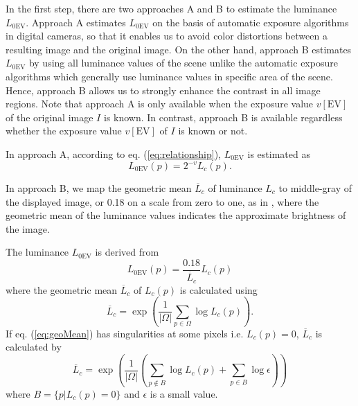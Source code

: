\documentclass[paper]{ieice}
\begin{document}
  In the first step, there are two approaches A and B
  to estimate the luminance $L_{0 \mathrm{EV}}$.
  Approach A estimates $L_{0 \mathrm{EV}}$ on the basis of automatic exposure algorithms
  in digital cameras,
  so that it enables us to avoid color distortions between
  a resulting image and the original image.
  On the other hand, approach B estimates $L_{0 \mathrm{EV}}$
  by using all luminance values of the scene
  unlike the automatic exposure algorithms
  which generally use luminance values in specific area of the scene.
  Hence, approach B allows us to strongly enhance the contrast in all image regions.
  Note that approach A is only available
  when the exposure value $v \mathrm{[EV]}$ of the original image $I$ is known.
  In contrast, approach B is available regardless
  whether the exposure value $v \mathrm{[EV]}$ of $I$ is known or not.
%
  \begin{description}[style=nextline,font=\mdseries,leftmargin=0pt,listparindent=2em,parsep=1pt]
    \item[A. Estimating $L_{0 \mathrm{EV}}$ with exposure value $v$]
      In approach A, according to eq. (\ref{eq:relationship}),
      $L_{0 \mathrm{EV}}$ is estimated as
      \begin{equation}
        L_{0 \mathrm{EV}}(p) = 2^{-v} L_c(p).
        \label{eq:knownEV}
      \end{equation}
    \item[B. Estimating $L_{0\mathrm{EV}}$ without exposure value $v$]
      In approach B, we map the geometric mean $\overline{L}_c$ of luminance $L_c$ to
      middle-gray of the displayed image, or 0.18 on a scale from zero to one,
      as in \cite{reinhard2002photographic},
      where the geometric mean of the luminance values indicates
      the approximate brightness of the image.
      
      The luminance $L_{0\mathrm{EV}}$ is derived from
      \begin{equation}
        L_{0\mathrm{EV}}(p) = \frac{0.18}{\overline{L}_c} L_c(p)
        \label{eq:unknownEV}
      \end{equation}
      where the geometric mean $\overline{L}_c$ of $L_c(p)$ is calculated using
      \begin{equation}
        \overline{L}_c = \exp{\left(\frac{1}{|\Omega|} \sum_{p \in \Omega}
          \log{L_c(p)}\right)}.
        \label{eq:geoMean}
      \end{equation}
      If eq. (\ref{eq:geoMean}) has singularities at some pixels i.e. $L_c(p)=0$, 
      $\overline{L}_c$ is calculated by
      \begin{equation}
        \overline{L}_c =
          \exp{
            \left(\frac{1}{|\Omega|}
              \left(
                \sum_{p \notin B} \log{L_c(p)}
                + \sum_{p \in B} \log{\epsilon}
              \right)
            \right)
          }
        \label{eq:geoMeanEps}
      \end{equation}
      where $B = \{p | L_c(p)=0\}$ and $\epsilon$ is a small value.
  \end{description}
\end{document}
